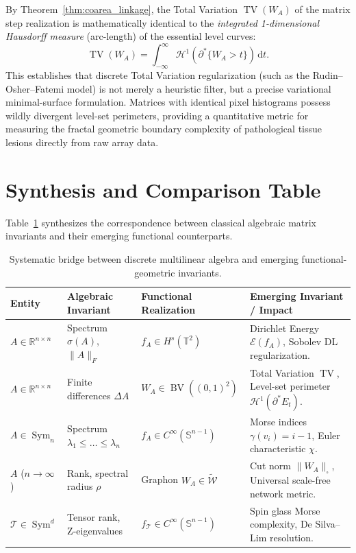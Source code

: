 \documentclass[11pt,a4paper,reqno]{amsart}
\theoremstyle{definition}
\numberwithin{equation}{section}
\newcommand{\R}{\mathbb{R}}
\newcommand{\Sph}{\mathbb{S}}
\newcommand{\Tor}{\mathbb{T}}
\newcommand{\BV}{\operatorname{BV}}
\newcommand{\TV}{\operatorname{TV}}
\newcommand{\cutnorm}[1]{\|#1\|_{\square}}
\newcommand{\dif}{\,\mathrm{d}}
\begin{document}
By Theorem~\ref{thm:coarea_linkage}, the Total Variation $\TV(W_A)$ of the matrix step realization is mathematically identical to the \emph{integrated 1-dimensional Hausdorff measure} (arc-length) of the essential level curves:
\begin{equation}
    \TV(W_A) = \int_{-\infty}^\infty \mathcal{H}^1(\partial^* \{W_A > t\}) \dif t.
\end{equation}
This establishes that discrete Total Variation regularization (such as the Rudin--Osher--Fatemi model) is not merely a heuristic filter, but a precise variational minimal-surface formulation. Matrices with identical pixel histograms possess wildly divergent level-set perimeters, providing a quantitative metric for measuring the fractal geometric boundary complexity of pathological tissue lesions directly from raw array data.

\section{Synthesis and Comparison Table}
\label{sec:synthesis}

Table~\ref{tab:comparison} synthesizes the correspondence between classical algebraic matrix invariants and their emerging functional counterparts.

\begin{table}[htbp]
\centering
\footnotesize
\renewcommand{\arraystretch}{1.3}
\begin{tabular}{@{}llll@{}}
\toprule
\textbf{Entity} & \textbf{Algebraic Invariant} & \textbf{Functional Realization} & \textbf{Emerging Invariant / Impact} \\
\midrule
$A \in \R^{n \times n}$ & Spectrum $\sigma(A)$, $\|A\|_F$ & $f_A \in H^s(\Tor^2)$ & Dirichlet Energy $\mathcal{E}(f_A)$, Sobolev DL regularization. \\
$A \in \R^{n \times n}$ & Finite differences $\Delta A$ & $W_A \in \BV((0,1)^2)$ & Total Variation $\TV$, Level-set perimeter $\mathcal{H}^1(\partial^* E_t)$. \\
$A \in \operatorname{Sym}_n$ & Spectrum $\lambda_1 \le \dots \le \lambda_n$ & $f_A \in C^\infty(\Sph^{n-1})$ & Morse indices $\gamma(v_i) = i-1$, Euler characteristic $\chi$. \\
$A$ ($n \to \infty$) & Rank, spectral radius $\rho$ & Graphon $W_A \in \widetilde{\mathcal{W}}$ & Cut norm $\cutnorm{W_A}$, Universal scale-free network metric. \\
$\mathcal{T} \in \operatorname{Sym}^d$ & Tensor rank, Z-eigenvalues & $f_{\mathcal{T}} \in C^\infty(\Sph^{n-1})$ & Spin glass Morse complexity, De Silva--Lim resolution. \\
\bottomrule
\end{tabular}
\caption{Systematic bridge between discrete multilinear algebra and emerging functional-geometric invariants.}
\label{tab:comparison}
\end{table}
\end{document}
